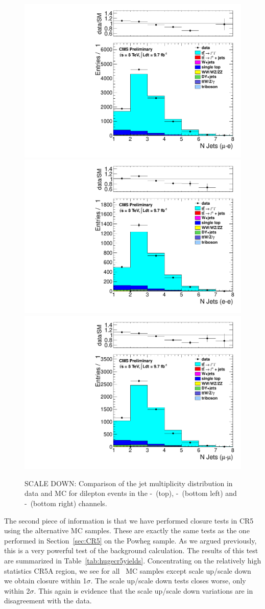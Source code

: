 \begin{figure}[hbt]
  \begin{center}
        \includegraphics[width=0.5\linewidth]{plots/njets_all_met50_mueg_scaledw.pdf}
        \includegraphics[width=0.5\linewidth]{plots/njets_all_met50_diel_scaledw.pdf}%
        \includegraphics[width=0.5\linewidth]{plots/njets_all_met50_dimu_scaledw.pdf}
        \caption{
          \label{fig:dileptonnjets_scaledw}%
          SCALE DOWN: Comparison of the jet multiplicity distribution in data and MC for dilepton events in the \E-\M\
          (top), \E-\E\ (bottom left) and \M-\M\ (bottom right) channels.}  
      \end{center}
\end{figure}


\clearpage

The second piece of information is that we have performed closure
tests in CR5 using the alternative MC samples.  These are exactly
the same tests as the one performed in Section~\ref{sec:CR5} on the
Powheg sample.  As we argued previously, this is a very powerful 
test of the background calculation.
The results of this test are summarized in Table~\ref{tab:hugecr5yields}.
Concentrating on the relatively high statistics CR5A region, we see
for all \ttbar\ MC samples except scale up/scale down we obtain
closure within 1$\sigma$.  The scale up/scale down tests closes
worse, only within 2$\sigma$.  This again is evidence that the 
scale up/scale down variations are in disagreement with the data.

